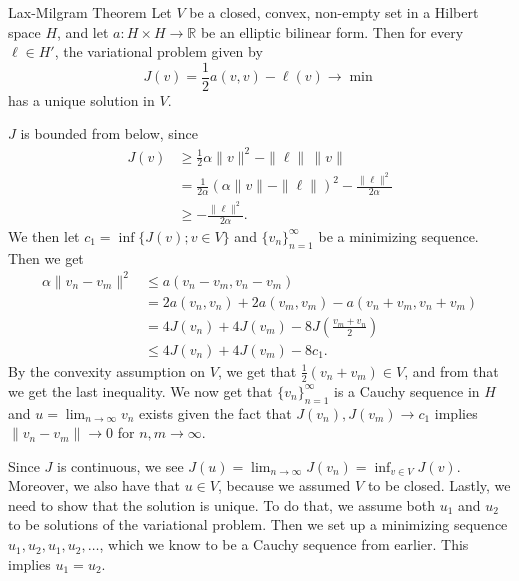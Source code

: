 \begin{thmx}{Lax-Milgram Theorem}
Let $V$ be a closed, convex, non-empty set in a Hilbert space $H$, and let $a:H \times H \rightarrow \mathbb{R}$ be an elliptic bilinear form. Then for every $\ell\in H'$, the variational problem given by
\[
    J(v)=\frac{1}{2} a(v,v) - \ell(v) \longrightarrow \min    
\]
has a unique solution in $V$.\label{thm:lax_milgram}
\end{thmx}

\begin{bev}
    $J$ is bounded from below, since
    \begin{align*}
        J(v) &\geq \frac{1}{2} \alpha \|v\|^2 - \|\ell\| \, \|v\|\\
        &= \frac{1}{2\alpha} {(\alpha \|v\|-\|\ell\|)}^2 - \frac{\|\ell\|^2}{2\alpha} \\
        &\geq - \frac{\|\ell\|^2}{2\alpha}.
    \end{align*}
    We then let $c_1 = \inf\{J(v); v \in V\}$ and ${\{v_n \}}_{n=1}^\infty$ be a minimizing sequence. Then we get 
    \begin{align*}
        \alpha \|v_n-v_m\|^2 &\leq a(v_n-v_m,v_n-v_m) \\
        &= 2a(v_n,v_n) + 2a(v_m,v_m) - a (v_n+v_m,v_n+v_m) \\
        &= 4J(v_n) + 4J(v_m) - 8J(\frac{v_m+v_n}{2}) \\
        &\leq 4J(v_n) + 4J(v_m) - 8c_1. 
    \end{align*}
    By the convexity assumption on $V$, we get that $\frac{1}{2}(v_n + v_m) \in V$, and from that we get the last 
    inequality.
    We now get that ${\{v_n \}}_{n=1}^\infty$ is a Cauchy sequence in $H$ and $u = \lim_{n\rightarrow \infty}v_n$ exists given the fact that $J(v_n),J(v_m)\rightarrow c_1$ implies $\|v_n - v_m\| \rightarrow 0$ for $n,m\rightarrow \infty$.  

    Since $J$ is continuous,
    we see $J(u) = \lim_{n\rightarrow \infty} J(v_n) = \inf_{v\in V} J(v)$.
     Moreover, we also have that $u\in V$, because we assumed $V$ to be closed. 
    Lastly, we need to show that the solution is unique.
     To do that, we assume both $u_1$ and $u_2$ to be solutions of the variational problem. 
    Then we set up a minimizing sequence $u_1,u_2,u_1,u_2,\ldots$, which we know to be a Cauchy sequence from earlier.
     This implies $u_1 = u_2$.
\end{bev}